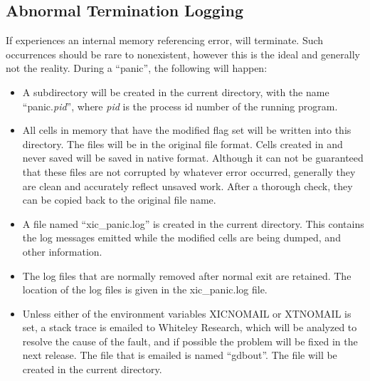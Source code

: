 \subsection{Abnormal Termination Logging}
If {\Xic} experiences an internal memory referencing error, {\Xic}
will terminate.  Such occurrences should be rare to nonexistent,
however this is the ideal and generally not the reality.  During a
``panic'', the following will happen:

\begin{itemize}
\item{A subdirectory will be created in the current directory, with
the name ``{\vt panic.}{\it pid\/}'', where {\it pid} is the process
id number of the running program.}

\item{All cells in memory that have the modified flag set will be
written into this directory.  The files will be in the original file
format.  Cells created in {\Xic} and never saved will be saved in
native format.  Although it can not be guaranteed that these files are
not corrupted by whatever error occurred, generally they are clean and
accurately reflect unsaved work.  After a thorough check, they can be
copied back to the original file name.}

\item{A file named ``{\vt xic\_panic.log}'' is created in the current
directory.  This contains the log messages emitted while the modified
cells are being dumped, and other information.}

\item{The log files that are normally removed after normal exit are
retained.  The location of the log files is given in the {\vt
xic\_panic.log} file.}

\item{Unless either of the environment variables {\et XICNOMAIL} or
{\et XTNOMAIL} is set, a stack trace is emailed to Whiteley Research,
which will be analyzed to resolve the cause of the fault, and if
possible the problem will be fixed in the next {\Xic} release.  The
file that is emailed is named ``{\vt gdbout}''.  The file will be
created in the current directory.}
\end{itemize}

